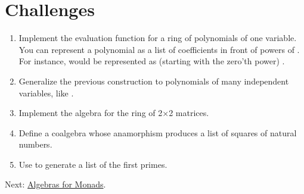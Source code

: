 \section{Challenges}\label{challenges}

\begin{enumerate}
\tightlist
\item
  Implement the evaluation function for a ring of polynomials of one
  variable. You can represent a polynomial as a list of coefficients in
  front of powers of . For instance,  would be
  represented as (starting with the zero'th power)
  \code{{[}-1,\ 0,\ 4{]}}.
\item
  Generalize the previous construction to polynomials of many
  independent variables, like .
\item
  Implement the algebra for the ring of 2×2 matrices.
\item
  Define a coalgebra whose anamorphism produces a list of squares of
  natural numbers.
\item
  Use  to generate a list of the first 
  primes.
\end{enumerate}

Next:
\href{https://bartoszmilewski.com/2017/03/14/algebras-for-monads/}{Algebras
for Monads}.
